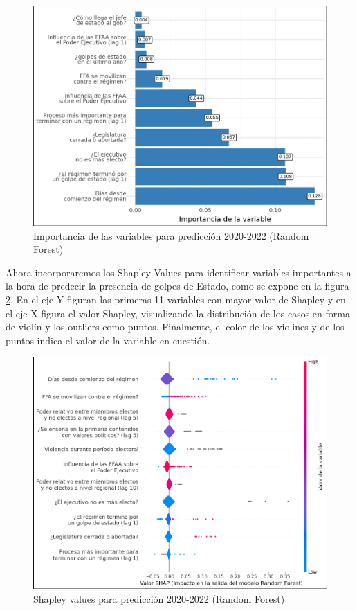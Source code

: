\documentclass{article}
\begin{document}
\begin{figure}[H]
  \centering  
  \includegraphics[width=1\textwidth]{8_feature_importance.png}
  \caption{Importancia de las variables para predicción 2020-2022 (Random Forest) \label{fig:feat_imp}}
\end{figure}

Ahora incorporaremos los Shapley Values para identificar variables importantes a la hora
de predecir la presencia de golpes de Estado, como se expone en la figura \ref{fig:shapley}.
En el eje Y figuran las primeras 11 variables con mayor valor de Shapley y en el eje X figura
el valor Shapley, visualizando la distribución de los casos en forma de violín y los outliers 
como puntos. Finalmente, el color de los violines y de los puntos indica el valor de la 
variable en cuestión.

\begin{figure}[H]
  \centering
  \includegraphics[width=1\textwidth]{7_shapley_values.png}
  \caption{Shapley values para predicción 2020-2022 (Random Forest)\label{fig:shapley}}
\end{figure}
\end{document}
